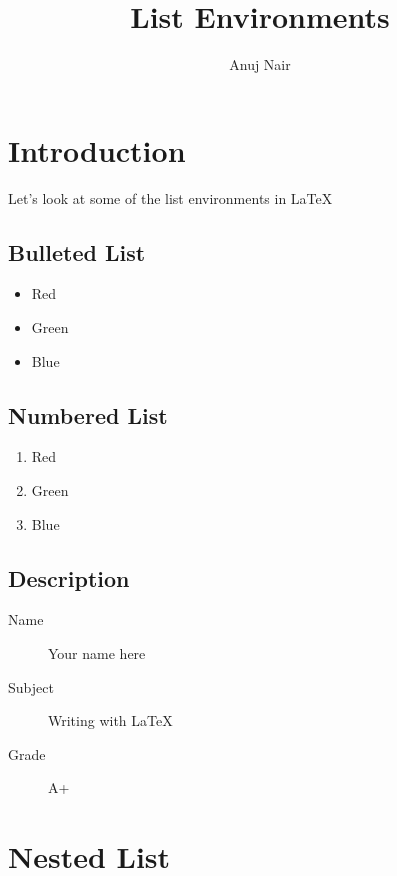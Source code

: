 \documentclass{article}
\title{List Environments}
\author{Anuj Nair}
\date{}
\begin{document}
\maketitle

\section{Introduction}

Let's look at some of the list environments in {\LaTeX}

\subsection{Bulleted List}

\begin{itemize}
				\item Red
				\item Green
				\item Blue
\end{itemize}

\subsection{Numbered List}

\begin{enumerate}
				\item Red
				\item Green
				\item Blue
\end{enumerate}

\subsection{Description}

\begin{description}

	\item[Name] Your name here
	\item[Subject] Writing with {\LaTeX}
	\item[Grade] A+

\end{description}



\section{Nested List}
\end{document}
